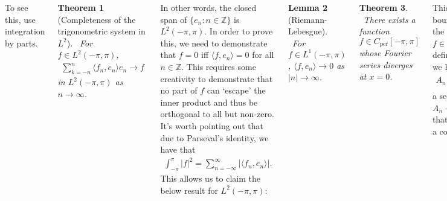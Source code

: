 \documentclass{tikzposter} %
\newtheorem{theorem}{Theorem}
\newtheorem{lemma}[theorem]{Lemma}
\begin{document}
\begin{columns}
{    To see this, use integration by parts. \\

    \begin{theorem}[Completeness of the trigonometric system in $L^{2}$]
    \ For $f \in L^{2}(-\pi, \pi)$,
    \begin{align*}
      \sum_{k=-n}^{n} \langle f_{n}, e_{n}\rangle e_{n} \to f
    \end{align*}
    in $L^{2}(-\pi, \pi)$ as $n \to \infty$.
    \end{theorem}
    \hphantom{}

    In other words, the closed span of $\{e_{n} : n \in \mathbb{Z}\}$ is $L^{2}(-\pi, \pi)$. In order to prove this, we need to demonstrate that $f = 0$ iff $\langle f, e_{n} \rangle = 0$ for all $n \in \mathbb{Z}$. This requires some creativity to demonstrate that no part of $f$ can `escape' the inner product and thus be orthogonal to all but non-zero. \\

    It's worth pointing out that due to Parseval's identity, we have that
    \begin{align*}
      \int_{-\pi}^{\pi} |f|^{2} = \sum_{n=-\infty}^{\infty} |\langle f_{n}, e_{n} \rangle|.
    \end{align*}
    This allows us to claim the below result for $L^{2}(-\pi,\pi)$: \\

    \begin{lemma}[Riemann-Lebesgue]
    \ For $f \in L^{1}(-\pi, \pi)$, $\langle f, e_{n} \rangle \to 0$ as $|n| \to \infty$.
    \end{lemma}
    \hphantom{}

    \begin{theorem}
    \ There exists a function $f \in C_{\mathrm{per}}[-\pi,\pi]$ whose Fourier series diverges at $x = 0$.
    \end{theorem}
    \hphantom{}

    This is a consequence of the uniform boundedness theorem proven later in the course. Assuming that for any $f \in C(-\pi, \pi)$, $\mathcal{F}(f)(0)$ is well-defined under pointwise convergence, we have
    \begin{align*}
      A_{n}(f) = \int_{-\pi}^{\pi} f(u) \sum_{k=-n}^{n} e^{iku} \, \mathrm{d}u
    \end{align*}
    a sequence in $C_{\mathrm{per}}[-\pi,\pi]^{*}$ such that $A_{n} \to A$ pointwise. Yet we can see that $\Vert A_{n} \Vert_{*} \to \infty$ as $n \to \infty$, giving us a contradiction. \\


}
\end{columns}
\end{document}
